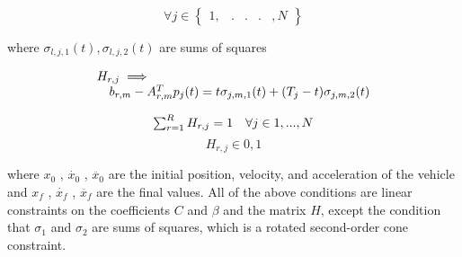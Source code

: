 \begin{equation}
	\forall j \in \begin{Bmatrix}1,
	&.  &.  &. & ,N 
	\end{Bmatrix}
\end{equation}

where $\sigma_{l,j,1}(t), \sigma_{l,j,2}(t) $ are sums of squares

	\[
	\begin{array}{@{}l@{}} 
	{H_{r,j}} \implies\\ \quad {b_{r,m}} - {A_{r,m}^{T}}{p_{j}}(t) = t{\sigma_{j,m,1}}(t) + (T_j - t){\sigma_{j,m,2}}(t)  \\ 
	
	\end{array}
	\]


\[
\begin{array}{@{}l@{}} 
\sum_{r=1}^{R}{H_{r,j}} = 1 \quad \forall j \in {1, ..., N}  \\ 
\end{array}
\]
	\begin{equation}  \label{eq:eq24_deits}
 {H_{r,j}} \in {0,1}
	\end{equation}
	
	where ${x_{0}}$ , $\dot{x_0}$ , $\ddot{x_0}$ are the initial position, velocity, and 	acceleration of the vehicle and ${x_{f}}$ , $\dot{x_f}$ , $\ddot{x_f}$ are the final values. All of the above conditions are linear constraints on the coefficients $C$ and $\beta$ and the matrix $H$, except the condition that $\sigma_1$ and $\sigma_2$ are sums of squares, which is a rotated second-order cone constraint.	 
